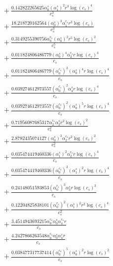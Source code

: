 \documentclass[10pt]{article}
\begin{document}
\begin{align*}
&{}  + \frac{0.142822265625 \alpha_{0}^s \left(\alpha_{1}^s\right)^{2} r^{3} \log{\left(c_{s} \right)}^{4}}{c_{s}^{3}} \\
&{}  + \frac{18.218720162564 \left(\alpha_{0}^s\right)^{3} \alpha_{1}^{c_s} r^{3} \log{\left(c_{s} \right)}}{c_{s}^{3}} \\
&{}  + \frac{0.3149255390756 \alpha_{0}^{c_s} \left(\alpha_{0}^s\right)^{2} r^{5} \log{\left(c_{s} \right)}^{2}}{c_{s}^{5}} \\
&{}  + \frac{0.011824806486779 \left(\alpha_{0}^s\right)^{4} \alpha_{2}^{c_s} r \log{\left(c_{s} \right)}^{4}}{c_{s}} \\
&{}  + \frac{0.011824806486779 \left(\alpha_{0}^{c_s}\right)^{3} \left(\alpha_{0}^s\right)^{4} r \log{\left(c_{s} \right)}^{4}}{c_{s}} \\
&{}  + \frac{0.039274612973557 \left(\alpha_{0}^{c_s}\right)^{2} \alpha_{4}^s r \log{\left(c_{s} \right)}^{4}}{c_{s}} \\
&{}  + \frac{0.039274612973557 \left(\alpha_{0}^{c_s}\right)^{2} \left(\alpha_{0}^s\right)^{5} r \log{\left(c_{s} \right)}^{4}}{c_{s}} \\
&{}  + \frac{0.71956087685317 \alpha_{2}^{c_s} \alpha_{2}^s r^{2} \log{\left(c_{s} \right)}^{2}}{c_{s}^{2}} \\
&{}  + \frac{2.8782435074127 \left(\alpha_{0}^s\right)^{3} \alpha_{2}^{c_s} r^{2} \log{\left(c_{s} \right)}^{2}}{c_{s}^{2}} \\
&{}  + \frac{0.035474419460336 \left(\alpha_{1}^s\right)^{2} \alpha_{2}^{c_s} r \log{\left(c_{s} \right)}^{4}}{c_{s}} \\
&{}  + \frac{0.035474419460336 \left(\alpha_{0}^{c_s}\right)^{3} \left(\alpha_{1}^s\right)^{2} r \log{\left(c_{s} \right)}^{4}}{c_{s}} \\
&{}  + \frac{0.24148051593853 \left(\alpha_{0}^{c_s}\right)^{3} \alpha_{3}^s r \log{\left(c_{s} \right)}^{3}}{c_{s}} \\
&{}  + \frac{0.12204825838101 \left(\alpha_{0}^{c_s}\right)^{2} \left(\alpha_{1}^s\right)^{2} r^{2} \log{\left(c_{s} \right)}^{4}}{c_{s}^{2}} \\
&{}  + \frac{3.4514943693215 \alpha_{0}^{c_s} \alpha_{0}^s \alpha_{4}^{c_s} r}{c_{s}} \\
&{}  + \frac{4.2427866263548 \alpha_{0}^{c_s} \alpha_{0}^s \alpha_{4}^s r}{c_{s}} \\
&{}  + \frac{0.038477317737414 \left(\alpha_{0}^{c_s}\right)^{5} \left(\alpha_{0}^s\right)^{2} r \log{\left(c_{s} \right)}^{2}}{c_{s}} \\

\end{align*}
\end{document}
